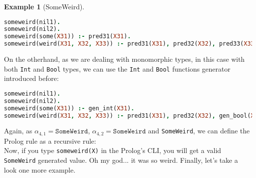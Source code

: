 \documentclass{report}
\theoremstyle{definition}
\newtheorem{example}{Example}[section]
\theoremstyle{definition}
\newcommand{\ttt}[1]{\texttt{#1}}
\begin{document}
\begin{example}[SomeWeird]
\begin{lstlisting}[language=Prolog]
someweird(nil1).																														%% rule 1
someweird(nil2).																														%% rule 2
someweird(some(X31)) :- pred31(X31).																				%% rule 3
someweird(weird(X31, X32, X33)) :- pred31(X31), pred32(X32), pred33(X33).		%% rule 4
\end{lstlisting}
On the otherhand, as we are dealing with monomorphic types, in this case with both \ttt{Int} and \ttt{Bool} types, we can use the \ttt{Int} and \ttt{Bool} functions generator introduced before:\\
\begin{lstlisting}[language=Prolog]
someweird(nil1).																														%% rule 1
someweird(nil2).																														%% rule 2
someweird(some(X31)) :- gen_int(X31).																				%% rule 3
someweird(weird(X31, X32, X33)) :- pred31(X31), pred32(X32), gen_bool(X33).	%% rule 4
\end{lstlisting}
Again, as $\alpha_{4,1} = \ttt{SomeWeird}$, $\alpha_{4,2} = \ttt{SomeWeird}$ and \ttt{SomeWeird}, we can define the Prolog rule as a recursive rule:\\

Now, if you type \ttt{someweird(X)} in the Prolog's CLI, you will get a valid \ttt{SomeWeird} generated value. Oh my god... it was so weird. Finally, let's take a look one more example.\\
\end{example}
\end{document}
